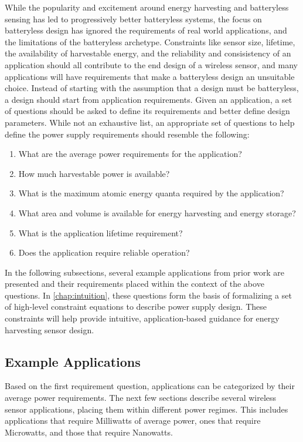 While the popularity and excitement around energy harvesting and batteryless sensing has led to progressively better batteryless systems, the focus on batteryless design has ignored the requirements of real world applications, and the limitations of the batteryless archetype.
Constraints like sensor size, lifetime, the availability of harvestable energy, and the reliability and consisistency of an application should all contribute to the end design of a wireless sensor, and many applications will have requirements that make a batteryless design an unsuitable choice.
Instead of starting with the assumption that a design must be batteryless, a design should start from application requirements. Given an application, a set of questions should be asked to define its requirements and better define design parameters.
While not an exhaustive list, an appropriate set of questions to help define the power supply requirements should resemble the following:

\begin{enumerate}
    \item What are the average power requirements for the application?
    \item How much harvestable power is available?
    \item What is the maximum atomic energy quanta required by the application?
    \item What area and volume is available for energy harvesting and energy storage?
    \item What is the application lifetime requirement?
    \item Does the application require reliable operation?
\end{enumerate}

\noindent In the following subsections, several example applications from prior work are presented and their requirements placed within the context of the above questions. In \cref{chap:intuition}, these questions form the basis of formalizing a set of high-level constraint equations to describe power supply design.
These constraints will help provide intuitive, application-based guidance for energy harvesting sensor design.

\subsection{Example Applications}
Based on the first requirement question, applications can be categorized by their average power requirements. The next few sections describe several wireless sensor applications, placing them within different power regimes. This includes applications that require Milliwatts of average power, ones that require Microwatts, and those that require Nanowatts.

